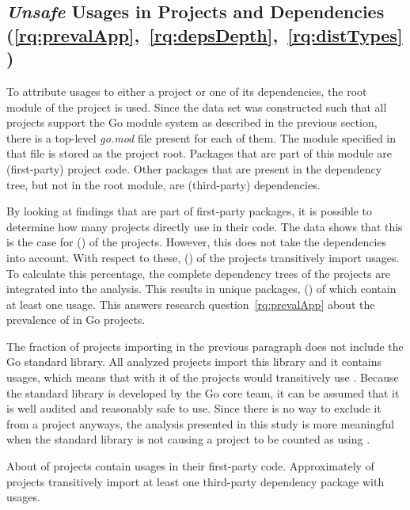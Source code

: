 \subsection{\textit{Unsafe} Usages in Projects and Dependencies (\ref{rq:prevalApp},~\ref{rq:depsDepth},~\ref{rq:distTypes})}\label{subsec:go-geiger:evaluation:unsafe-usage}

To attribute \unsafe{} usages to either a project or one of its dependencies, the root module of the project is used.
Since the data set was constructed such that all projects support the Go module system as described in the previous
section, there is a top-level \textit{go.mod} file present for each of them.
The module specified in that file is stored as the project root.
Packages that are part of this module are (first-party) project code.
Other packages that are present in the dependency tree, but not in the root module, are (third-party) dependencies.

By looking at \unsafe{} findings that are part of first-party packages, it is possible to determine how many projects
directly use \unsafe{} in their code.
The data shows that this is the case for \unsafeProjects{} (\percentageUnsafeProjects{}) of the \projsAnalyzed{}
projects.
However, this does not take the dependencies into account.
With respect to these, \unsafeTransitiveWithDependencies{} (\percentageUnsafeTransitiveWithDependencies{}) of the
projects transitively import \unsafe{} usages.
To calculate this percentage, the complete dependency trees of the projects are integrated into the analysis.
This results in \packagesAnalyzed{} unique packages, \unsafePackages{} (\percentageUnsafePackages{}) of which contain at
least one \unsafe{} usage.
This answers research question~\ref{rq:prevalApp} about the prevalence of \unsafe{} in Go projects.

The fraction of projects importing \unsafe{} in the previous paragraph does not include the Go standard library.
All analyzed projects import this library and it contains \unsafe{} usages, which means that with it  of
the projects would transitively use \unsafe{}.
Because the standard library is developed by the Go core team, it can be assumed that it is well audited and reasonably
safe to use.
Since there is no way to exclude it from a project anyways, the analysis presented in this study is more meaningful
when the standard library is not causing a project to be counted as using \unsafe{}.

\begin{answerToRQ}[\ref{rq:prevalApp}]
    About \percentageUnsafeProjectsRounded{} of projects contain \unsafe{} usages in their first-party code.
    Approximately \percentageUnsafeTransitiveWithDependenciesRounded{} of projects transitively import at least one
    third-party dependency package with \unsafe{} usages.
\end{answerToRQ}


